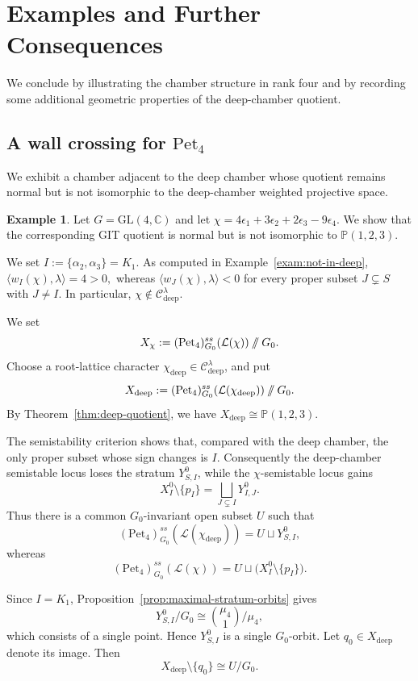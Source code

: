\documentclass[12pt, reqno]{amsart}
\newcommand{\sslash}{\mathbin{/\mkern-6mu/}}
\theoremstyle{plain}
\numberwithin{equation}{section}
\theoremstyle{definition}
\newtheorem{example}{Example}
\begin{document}
\section{Examples and Further Consequences}

We conclude by illustrating the chamber structure in rank four and by
recording some additional geometric properties of the deep-chamber
quotient.

\subsection{A wall crossing for \(\mathrm{Pet}_4\)}
We exhibit a chamber adjacent to the deep chamber whose quotient
remains normal but is not isomorphic to the deep-chamber weighted
projective space.

\begin{example}\label{examp:not-weighted}
Let $G=\mathrm{GL}(4,\mathbb C)$ and let $\chi=4\epsilon_1+3\epsilon_2+2\epsilon_3-9\epsilon_4$. We show
that the corresponding GIT quotient is normal but is not isomorphic
to \(\mathbb P(1,2,3)\).

We set $I:=\{\alpha_2,\alpha_3\}=K_1.$ As computed in Example~\ref{exam:not-in-deep}, $\langle w_I(\chi),\lambda\rangle=4>0,$
whereas $\langle w_J(\chi),\lambda\rangle<0$
for every proper subset \(J\subsetneq S\) with \(J\neq I\).
In particular, $\chi\notin\mathcal C^\lambda_{\mathrm{deep}}.$

We set
\[
X_\chi
:=
(\mathrm{Pet}_4)^{ss}_{G_0}(\mathcal L(\chi))
\sslash G_0.
\]
Choose a root-lattice character
\(\chi_{\mathrm{deep}}\in\mathcal C^\lambda_{\mathrm{deep}}\), and put
\[
X_{\mathrm{deep}}
:=
(\mathrm{Pet}_4)^{ss}_{G_0}
(\mathcal L(\chi_{\mathrm{deep}}))
\sslash G_0.
\]
By Theorem~\ref{thm:deep-quotient}, we have $X_{\mathrm{deep}}\cong\mathbb P(1,2,3).$

The semistability criterion shows that, compared with the deep
chamber, the only proper subset whose sign changes is \(I\).
Consequently the deep-chamber semistable locus loses the stratum
\(Y^0_{S,I}\), while the \(\chi\)-semistable locus gains
\[
X_I^0\setminus\{p_I\}
=
\bigsqcup_{J\subsetneq I}Y^0_{I,J}.
\]
Thus there is a common \(G_0\)-invariant open subset \(U\) such that
\[
(\mathrm{Pet}_4)^{ss}_{G_0}
(\mathcal L(\chi_{\mathrm{deep}}))
=
U\sqcup Y^0_{S,I},
\]
whereas
\[
(\mathrm{Pet}_4)^{ss}_{G_0}(\mathcal L(\chi))
=
U\sqcup\bigl(X_I^0\setminus\{p_I\}\bigr).
\]

Since \(I=K_1\), Proposition~\ref{prop:maximal-stratum-orbits} gives
\[
Y^0_{S,I}/G_0
\cong
\binom{\mu_4}{1}/\mu_4,
\]
which consists of a single point. Hence \(Y^0_{S,I}\) is a single
\(G_0\)-orbit. Let $q_0\in X_{\mathrm{deep}}$
denote its image. Then
\begin{equation}\label{eq:example-common-open-deep}
X_{\mathrm{deep}}\setminus\{q_0\}
\cong
U/G_0.
\end{equation}


\end{example}
\end{document}
